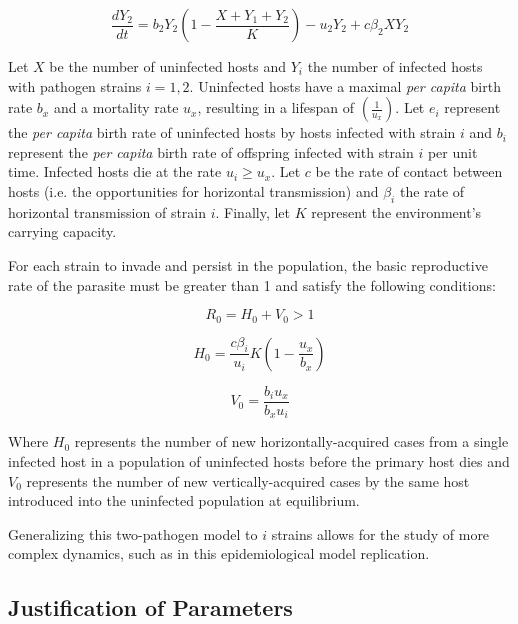 \begin{equation}
\frac{dY_2}{dt} = b_2 Y_2(1 - \frac{X + Y_1 + Y_2}{K}) - u_2 Y_2 + c \beta_2 X Y_2
\label{eqn:3}
\end{equation}

Let $X$ be the number of uninfected hosts and $Y_i$ the number of infected
hosts with pathogen strains $i = 1, 2$. Uninfected hosts have a maximal
\emph{per capita} birth rate $b_x$ and a mortality rate $u_x$, resulting in a
lifespan of $(\frac{1}{u_x})$. Let $e_i$ represent the \emph{per capita} birth
rate of uninfected hosts by hosts infected with strain $i$ and $b_i$ represent
the \emph{per capita} birth rate of offspring infected with strain $i$ per unit
time. Infected hosts die at the rate $u_i \geq u_x$. Let $c$ be the rate of
contact between hosts (i.e. the opportunities for horizontal transmission) and
$\beta_i$ the rate of horizontal transmission of strain $i$. Finally, let $K$
represent the environment’s carrying capacity.

For each strain to invade and persist in the population, the basic reproductive
rate of the parasite must be greater than 1 and satisfy the following conditions:

\begin{equation}
R_0 = H_0 + V_0 > 1
\label{eqn:4}
\end{equation}

\begin{equation}
H_0 = \frac{c \beta_i}{u_i} K(1- \frac{u_x}{b_x})
\label{eqn:5}
\end{equation}

\begin{equation}
V_0 = \frac{b_i u_x}{b_x u_i}
\label{eqn:6}
\end{equation}

Where $H_0$ represents the number of new horizontally-acquired cases from a
single infected host in a population of uninfected hosts before the primary
host dies and $V_0$ represents the number of new vertically-acquired cases by
the same host introduced into the uninfected population at equilibrium.

Generalizing this two-pathogen model to $i$ strains allows for the study of
more complex dynamics, such as in this epidemiological model replication.


\subsection{Justification of Parameters}

